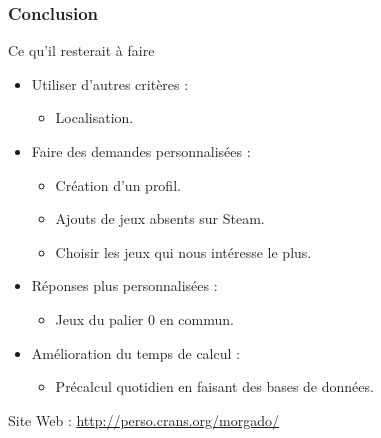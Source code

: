 \documentclass[10pt]{beamer}
\begin{document}
\begin{frame}
 \frametitle{Conclusion}
 
 \begin{block}{Ce qu'il resterait à faire}
  \begin{itemize}
   \item Utiliser d'autres critères : 
   \begin{itemize}
    \item Localisation.
   \end{itemize}
   \item Faire des demandes personnalisées : 
    \begin{itemize}
    \item Création d'un profil.
    \item Ajouts de jeux absents sur Steam.
    \item Choisir les jeux qui nous intéresse le plus.
    \end{itemize}
  \item Réponses plus personnalisées :
  \begin{itemize}
   \item Jeux du palier $0$ en commun.
  \end{itemize}
  \item Amélioration du temps de calcul :
  \begin{itemize}
   \item Précalcul quotidien en faisant des bases de données.
  \end{itemize}

  \end{itemize}
  
 \end{block}
 
 Site Web : \url{http://perso.crans.org/morgado/}

\end{frame}
\end{document}
